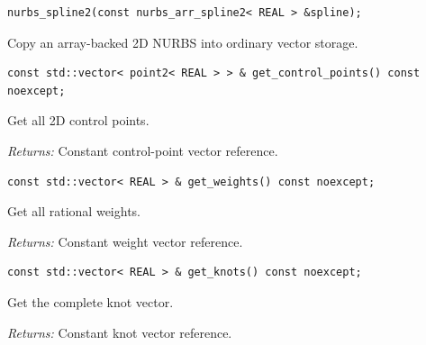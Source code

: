 \par\noindent\begin{minipage}{\linewidth}
\begin{lstlisting}[style=apireference]
nurbs_spline2(const nurbs_arr_spline2< REAL > &spline);
\end{lstlisting}
{\footnotesize Copy an array-backed 2D NURBS into ordinary vector storage.\par}
\end{minipage}\par\vspace{1pt}
\par\noindent\begin{minipage}{\linewidth}
\begin{lstlisting}[style=apireference]
const std::vector< point2< REAL > > & get_control_points() const noexcept;
\end{lstlisting}
{\footnotesize Get all 2D control points.\par}
{\footnotesize\textit{Returns:} Constant control-point vector reference.\par}
\end{minipage}\par\vspace{1pt}
\par\noindent\begin{minipage}{\linewidth}
\begin{lstlisting}[style=apireference]
const std::vector< REAL > & get_weights() const noexcept;
\end{lstlisting}
{\footnotesize Get all rational weights.\par}
{\footnotesize\textit{Returns:} Constant weight vector reference.\par}
\end{minipage}\par\vspace{1pt}
\par\noindent\begin{minipage}{\linewidth}
\begin{lstlisting}[style=apireference]
const std::vector< REAL > & get_knots() const noexcept;
\end{lstlisting}
{\footnotesize Get the complete knot vector.\par}
{\footnotesize\textit{Returns:} Constant knot vector reference.\par}
\end{minipage}\par\vspace{1pt}
